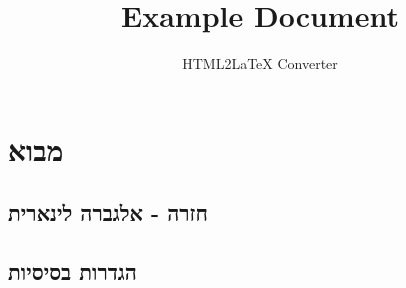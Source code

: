 \documentclass{tstextbook}
\begin{document}
\title{Example Document}
\author{HTML2LaTeX Converter}
\maketitle

\section{מבוא}

\subsection{חזרה - אלגברה לינארית}

\subsection{הגדרות בסיסיות}
\end{document}
